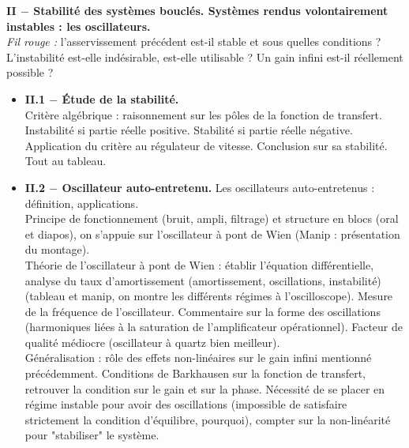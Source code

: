 \documentclass[11pt,a4paper]{report}
\begin{document}
\textbf{II $-$ Stabilité des systèmes bouclés. Systèmes rendus volontairement instables : les oscillateurs.}\\
\textit{Fil rouge :} l'asservissement précédent est-il stable et sous quelles conditions ? 
L'instabilité est-elle indésirable, est-elle utilisable ? 
Un gain infini est-il réellement possible ?
\begin{itemize}
		\item \textbf{II.1 $-$ \'Etude de la stabilité.}\\
		Critère algébrique : raisonnement sur les pôles de la fonction de transfert. Instabilité si partie réelle positive. Stabilité si partie réelle négative.\\
		Application du critère au régulateur de vitesse. Conclusion sur sa stabilité. Tout au tableau.
		\item \textbf{II.2 $-$ Oscillateur auto-entretenu.}
		Les oscillateurs auto-entretenus : définition, applications.\\
		Principe de fonctionnement (bruit, ampli, filtrage) et structure en blocs (oral et diapos), on s'appuie sur l'oscillateur à pont de Wien (Manip : présentation du montage).\\
		Théorie de l'oscillateur à pont de Wien : établir l'équation différentielle, analyse du taux d'amortissement (amortissement, oscillations, instabilité) (tableau et manip, on montre les différents régimes à l'oscilloscope).
		Mesure de la fréquence de l'oscillateur. Commentaire sur la forme des oscillations (harmoniques liées à la saturation de l'amplificateur opérationnel). Facteur de qualité médiocre (oscillateur à quartz bien meilleur).\\
		Généralisation : rôle des effets non-linéaires sur le gain infini mentionné précédemment. Conditions de Barkhausen sur la fonction de transfert, retrouver la condition sur le gain et sur la phase. Nécessité de se placer en régime instable pour avoir des oscillations (impossible de satisfaire strictement la condition d'équilibre, pourquoi), compter sur la non-linéarité pour "stabiliser" le système.\\ 			
\end{itemize}
		
\end{document}
